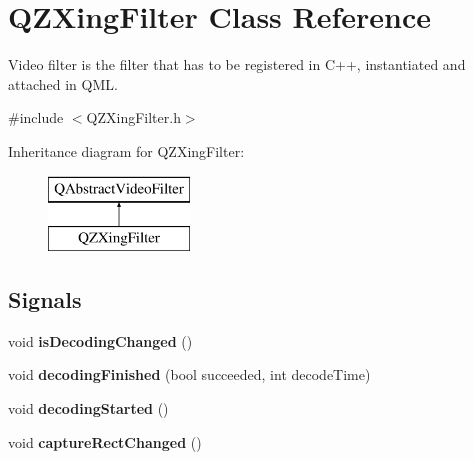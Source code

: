 \hypertarget{class_q_z_xing_filter}{}\section{Q\+Z\+Xing\+Filter Class Reference}
\label{class_q_z_xing_filter}


Video filter is the filter that has to be registered in C++, instantiated and attached in Q\+ML.  




{\ttfamily \#include $<$Q\+Z\+Xing\+Filter.\+h$>$}

Inheritance diagram for Q\+Z\+Xing\+Filter\+:\begin{figure}[H]
\begin{center}
\leavevmode
\includegraphics[height=2.000000cm]{class_q_z_xing_filter}
\end{center}
\end{figure}
\subsection*{Signals}
\begin{DoxyCompactItemize}
\item 
\mbox{\label{class_q_z_xing_filter_af7cf503201b661c6f363531b41c5a46e}} 
void {\bfseries is\+Decoding\+Changed} ()
\item 
\mbox{\label{class_q_z_xing_filter_a36baff95b549dfba062f734e2f085d6c}} 
void {\bfseries decoding\+Finished} (bool succeeded, int decode\+Time)
\item 
\mbox{\label{class_q_z_xing_filter_a20fcece9b053df2e9b9ce9baaba06683}} 
void {\bfseries decoding\+Started} ()
\item 
\mbox{\label{class_q_z_xing_filter_a97fc4b960832be7c430baffad53876e1}} 
void {\bfseries capture\+Rect\+Changed} ()
\end{DoxyCompactItemize}
